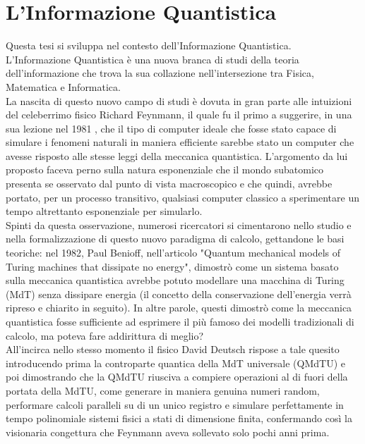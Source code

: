 \documentclass[12pt,a4paper,openright]{report}
\begin{document}
\chapter{L'Informazione Quantistica}
Questa tesi si sviluppa nel contesto dell'Informazione Quantistica.\\
L'Informazione Quantistica è una nuova branca di studi della teoria dell'informazione che trova la sua collazione nell'intersezione tra
Fisica, Matematica e Informatica.\\
La nascita di questo nuovo campo di studi è dovuta in gran parte alle intuizioni del celeberrimo fisico Richard Feynmann, il quale fu il primo a suggerire,
in una sua lezione nel 1981 \cite{ref6}, che il tipo di computer ideale che fosse stato capace di simulare i fenomeni naturali in maniera
efficiente sarebbe stato un computer che avesse risposto alle stesse leggi della meccanica quantistica. L'argomento da lui proposto faceva
perno sulla natura esponenziale che il mondo subatomico presenta se osservato dal punto di vista macroscopico e che quindi, avrebbe portato,
per un processo transitivo, qualsiasi computer classico a sperimentare un tempo altrettanto esponenziale per simularlo.\\
Spinti da questa osservazione, numerosi ricercatori si cimentarono nello studio e nella formalizzazione di questo nuovo paradigma di calcolo,
gettandone le basi teoriche: nel 1982, Paul Benioff, nell'articolo "Quantum mechanical models of Turing machines that dissipate no energy"\cite{ref7}, 
dimostrò come un sistema basato sulla meccanica quantistica avrebbe potuto modellare una macchina di Turing (MdT) senza dissipare energia (il concetto della conservazione dell'energia 
verrà ripreso e chiarito in seguito). In altre parole, questi dimostrò come la meccanica quantistica fosse sufficiente ad esprimere il più
famoso dei modelli tradizionali di calcolo, ma poteva fare addirittura di meglio? \\
All'incirca nello stesso momento il fisico David Deutsch rispose a tale quesito introducendo prima la controparte quantica della MdT universale (QMdTU)
e poi dimostrando che la QMdTU riusciva a compiere operazioni al di fuori della portata della MdTU, come generare in maniera genuina numeri random,
performare calcoli paralleli su di un unico registro e simulare perfettamente in tempo polinomiale sistemi fisici a stati di dimensione finita, confermando così
la visionaria congettura che Feynmann aveva sollevato solo pochi anni prima.  
\end{document}
